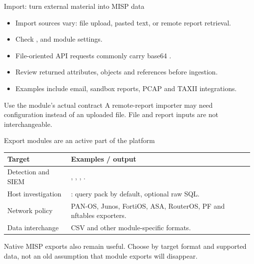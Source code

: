 \begin{frame}{Import: turn external material into MISP data}
    \begin{itemize}
        \item Import sources vary: file upload, pasted text, or remote report retrieval.
        \item Check ,  and module settings.
        \item File-oriented API requests commonly carry base64 .
        \item Review returned attributes, objects and references before ingestion.
        \item Examples include email, sandbox reports, PCAP and TAXII integrations.
    \end{itemize}
    \begin{block}{Use the module's actual contract}
        A remote-report importer may need configuration instead of an uploaded file.
        File and report inputs are not interchangeable.
    \end{block}
\end{frame}

\begin{frame}{Export modules are an active part of the platform}
    \small
    \begin{tabular}{P{3.1cm}P{7.1cm}}
        \toprule
        Target & Examples / output \\
        \midrule
        Detection and SIEM & , ,
        , . \\
        Host investigation & : query pack by default, optional raw SQL. \\
        Network policy & PAN-OS, Junos, FortiOS, ASA, RouterOS, PF and nftables exporters. \\
        Data interchange & CSV and other module-specific formats. \\
        \bottomrule
    \end{tabular}
    \medskip
    Native MISP exports also remain useful. Choose by target format and supported
    data, not an old assumption that module exports will disappear.
\end{frame}

